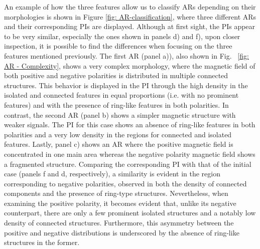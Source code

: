 \documentclass[12pt]{mythesis}
\begin{document}
An example of how the three features allow us to classify ARs depending on their morphologies is shown in Figure \ref{fig: AR-classification}, where three different ARs and their corresponding PIs are displayed. Although at first sight, the PIs appear to be very similar, especially the ones shown in panels d) and f), upon closer inspection, it is possible to find the differences when focusing on the three features mentioned previously. The first AR (panel a)), also shown in Fig. ~\ref{fig:  AR - Complexity}, shows a very complex morphology, where the magnetic field of both positive and negative polarities is distributed in multiple connected structures. This behavior is displayed in the PI through the high density in the isolated and connected features in equal proportions (i.e. with no prominent features) and with the presence of ring-like features in both polarities. In contrast, the second AR (panel b) shows a simpler magnetic structure with weaker signals. The PI for this case shows an absence of ring-like features in both polarities and a very low density in the regions for connected and isolated features. Lastly, panel c) shows an AR where the positive magnetic field is concentrated in one main area whereas the negative polarity magnetic field shows a fragmented structure. Comparing the corresponding PI with that of the initial case (panels f and d, respectively), a similarity is evident in the region corresponding to negative polarities, observed in both the density of connected components and the presence of ring-type structures. Nevertheless, when examining the positive polarity, it becomes evident that, unlike its negative counterpart, there are only a few prominent isolated structures and a notably low density of connected structures. Furthermore, this asymmetry between the positive and negative distributions is underscored by the absence of ring-like structures in the former.
\end{document}
